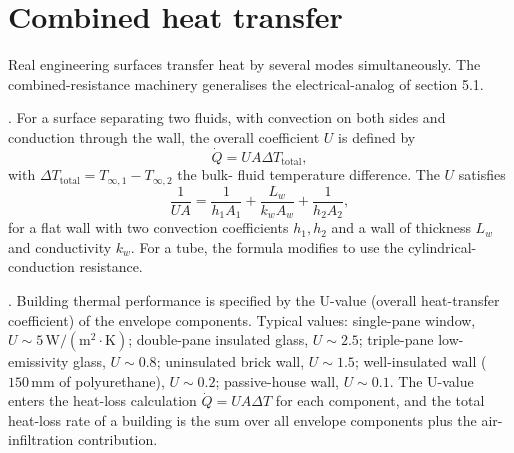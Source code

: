 \section{Combined heat transfer}

Real engineering surfaces transfer heat by several modes
simultaneously. The combined-resistance machinery generalises the
electrical-analog of section 5.1.

. For a surface separating
two fluids, with convection on both sides and conduction through the
wall, the overall coefficient $U$ is defined by
\[
\dot{Q} = U A \Delta T_{\text{total}},
\]
with $\Delta T_{\text{total}} = T_{\infty,1} - T_{\infty,2}$ the bulk-
fluid temperature difference. The $U$ satisfies
\[
\frac{1}{U A} = \frac{1}{h_1 A_1} + \frac{L_w}{k_w A_w} + \frac{1}{h_2
A_2},
\]
for a flat wall with two convection coefficients $h_1, h_2$ and a wall
of thickness $L_w$ and conductivity $k_w$. For a tube, the formula
modifies to use the cylindrical-conduction resistance.

. Building thermal performance is
specified by the U-value (overall heat-transfer coefficient) of the
envelope components. Typical values: single-pane window, $U \sim 5\,
\text{W}/(\text{m}^2\cdot\si{\kelvin})$; double-pane insulated glass,
$U \sim 2.5$; triple-pane low-emissivity glass, $U \sim 0.8$;
uninsulated brick wall, $U \sim 1.5$; well-insulated wall ($150\,
\si{\milli\meter}$ of polyurethane), $U \sim 0.2$; passive-house wall,
$U \sim 0.1$. The U-value enters the heat-loss calculation $\dot{Q} =
UA \Delta T$ for each component, and the total heat-loss rate of a
building is the sum over all envelope components plus the air-
infiltration contribution.

